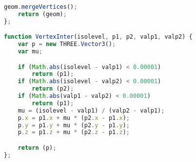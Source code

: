 \begin{lstlisting}[language=JavaScript]
    geom.mergeVertices();
    return (geom);
};

function VertexInter(isolevel, p1, p2, valp1, valp2) {
    var p = new THREE.Vector3();
    var mu;

    if (Math.abs(isolevel - valp1) < 0.00001)
        return (p1);
    if (Math.abs(isolevel - valp2) < 0.00001)
        return (p2);
    if (Math.abs(valp1 - valp2) < 0.00001)
        return (p1);
    mu = (isolevel - valp1) / (valp2 - valp1);
    p.x = p1.x + mu * (p2.x - p1.x);
    p.y = p1.y + mu * (p2.y - p1.y);
    p.z = p1.z + mu * (p2.z - p1.z);

    return (p);
};
\end{lstlisting}